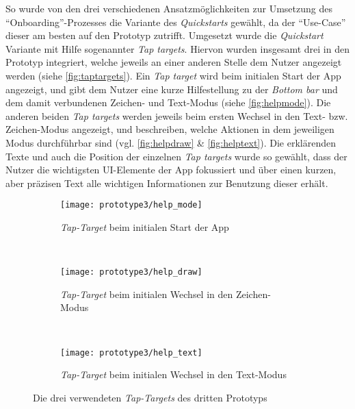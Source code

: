 So wurde von den drei verschiedenen Ansatzmöglichkeiten zur Umsetzung des ``Onboarding''-Prozesses die Variante des \emph{Quickstarts} gewählt, da der ``Use-Case'' dieser am besten auf den Prototyp zutrifft.
Umgesetzt wurde die \emph{Quickstart} Variante mit Hilfe sogenannter \emph{Tap targets}.
Hiervon wurden insgesamt drei in den Prototyp integriert, welche jeweils an einer anderen Stelle dem Nutzer angezeigt werden (siehe \autoref{fig:taptargets}).
Ein \emph{Tap target} wird beim initialen Start der App angezeigt, und gibt dem Nutzer eine kurze Hilfestellung zu der \emph{Bottom bar} und dem damit verbundenen Zeichen- und Text-Modus (siehe \autoref{fig:helpmode}).
Die anderen beiden \emph{Tap targets} werden jeweils beim ersten Wechsel in den Text- bzw. Zeichen-Modus angezeigt, und beschreiben, welche Aktionen in dem jeweiligen Modus durchführbar sind (vgl. \autoref{fig:helpdraw} \& \autoref{fig:helptext}).
Die erklärenden Texte und auch die Position der einzelnen \emph{Tap targets} wurde so gewählt, dass der Nutzer die wichtigsten UI-Elemente der App fokussiert und über einen kurzen, aber präzisen Text alle wichtigen Informationen zur Benutzung dieser erhält. \\

\begin{figure}[h]
  \begin{subfigure}[t]{0.3\textwidth}
    \centering
    \texttt{[image: prototype3/help\_mode]}
    \caption{\emph{Tap-Target} beim initialen Start der App}
    \label{fig:helpmode}
  \end{subfigure}
  ~
  \begin{subfigure}[t]{0.3\textwidth}
    \centering
    \texttt{[image: prototype3/help\_draw]}
    \caption{\emph{Tap-Target} beim initialen Wechsel in den Zeichen-Modus}
    \label{fig:helpdraw}
  \end{subfigure}
  ~
  \begin{subfigure}[t]{0.3\textwidth}
    \centering
    \texttt{[image: prototype3/help\_text]}
    \caption{\emph{Tap-Target} beim initialen Wechsel in den Text-Modus}
    \label{fig:helptext}
  \end{subfigure}
  \centering
  \caption{Die drei verwendeten \emph{Tap-Targets} des dritten Prototyps}
  \label{fig:taptargets}
\end{figure}

